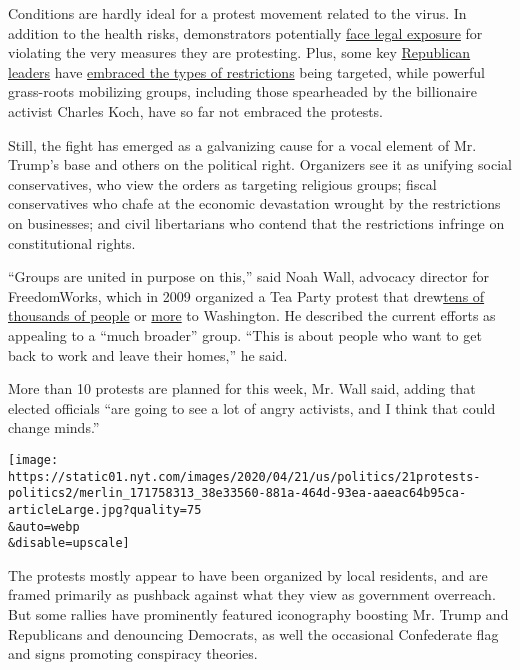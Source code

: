 Conditions are hardly ideal for a protest movement related to the virus.
In addition to the health risks, demonstrators potentially
\href{https://www.nj.com/coronavirus/2020/04/woman-charged-for-organizing-protest-of-murphys-coronavirus-stay-at-home-order.html}{face
legal exposure} for violating the very measures they are protesting.
Plus, some key
\href{https://www.nytimes.com/2020/04/03/us/politics/maryland-coronavirus.html}{Republican
leaders} have
\href{https://www.nytimes.com/2020/03/16/us/politics/virus-primary-2020-ohio.html}{embraced
the types of restrictions} being targeted, while powerful grass-roots
mobilizing groups, including those spearheaded by the billionaire
activist Charles Koch, have so far not embraced the protests.

Still, the fight has emerged as a galvanizing cause for a vocal element
of Mr. Trump's base and others on the political right. Organizers see it
as unifying social conservatives, who view the orders as targeting
religious groups; fiscal conservatives who chafe at the economic
devastation wrought by the restrictions on businesses; and civil
libertarians who contend that the restrictions infringe on
constitutional rights.

``Groups are united in purpose on this,'' said Noah Wall, advocacy
director for FreedomWorks, which in 2009 organized a Tea Party protest
that
drew\href{https://www.politico.com/story/2009/09/a-march-but-is-it-a-movement-027058}{tens
of thousands of people} or
\href{https://www.latimes.com/archives/la-xpm-2009-sep-15-na-crowd15-story.html}{more}
to Washington. He described the current efforts as appealing to a ``much
broader'' group. ``This is about people who want to get back to work and
leave their homes,'' he said.

More than 10 protests are planned for this week, Mr. Wall said, adding
that elected officials ``are going to see a lot of angry activists, and
I think that could change minds.''

\texttt{[image: https://static01.nyt.com/images/2020/04/21/us/politics/21protests-politics2/merlin\_171758313\_38e33560-881a-464d-93ea-aaeac64b95ca-articleLarge.jpg?quality=75\\\&auto=webp\\\&disable=upscale]}

The protests mostly appear to have been organized by local residents,
and are framed primarily as pushback against what they view as
government overreach. But some rallies have prominently featured
iconography boosting Mr. Trump and Republicans and denouncing Democrats,
as well the occasional Confederate flag and signs promoting conspiracy
theories.

